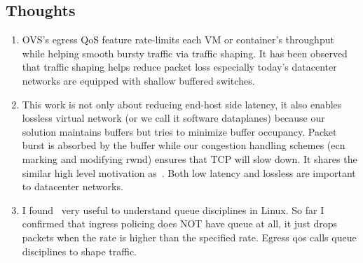 

\subsection{Thoughts}
\begin{enumerate}
\item OVS's egress QoS feature rate-limits each VM or container's throughput while helping smooth bursty traffic via
traffic shaping. It has been observed that traffic shaping helps reduce packet loss especially today's datacenter
networks are equipped with shallow buffered switches\cite{alizadeh2012less,traffic-shaping-ovs}.

\item This work is not only about reducing end-host side latency, it also enables lossless 
virtual network (or we call it software dataplanes) because our solution maintains buffers 
but tries to minimize buffer occupancy. Packet burst is absorbed by the 
buffer while our congestion handling schemes (ecn marking and modifying rwnd) 
ensures that TCP will slow down. It shares the similar high level motivation as~\cite{crisan2013got}. 
Both low latency and lossless are important to datacenter networks.

\item  I found~\cite{linux-qdisc} very useful to understand queue disciplines in Linux. 
So far I confirmed that ingress policing does NOT have queue at all, 
it just drops packets when the rate is higher than the specified rate. 
Egress qos calls queue disciplines to shape traffic.
\end{enumerate}

